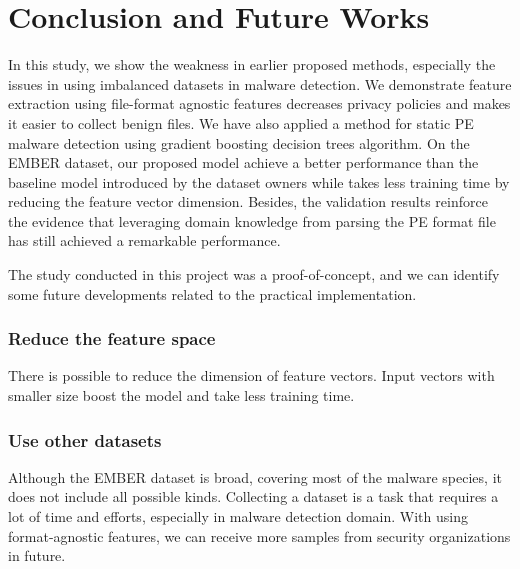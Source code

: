 \documentclass[runningheads]{llncs}
\begin{document}
\section{Conclusion and Future Works}

In this study, we show the weakness in earlier proposed methods, especially the issues in using imbalanced datasets in malware detection. 
We demonstrate feature extraction using file-format agnostic features decreases privacy policies and makes it easier to collect benign files. 
We have also applied a method for static PE malware detection using gradient boosting decision trees algorithm. 
On the EMBER dataset, our proposed model achieve a better performance than the baseline model introduced by the dataset owners while takes less training time by reducing the feature vector dimension. 
Besides, the validation results reinforce the evidence that leveraging domain knowledge from parsing the PE format file has still achieved a remarkable performance.

The study conducted in this project was a proof-of-concept, and we can identify some future developments related to the practical implementation.

\subsubsection{Reduce the feature space}

There is possible to reduce the dimension of feature vectors. Input vectors with smaller size boost the model and take less training time. 

\subsubsection{Use other datasets}

Although the EMBER dataset is broad, covering most of the malware species, it does not include all possible kinds. Collecting a dataset is a task that requires a lot of time and efforts, especially in malware detection domain. With using format-agnostic features, we can receive more samples from security organizations in future. 



\end{document}
